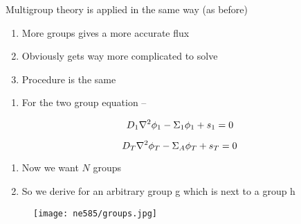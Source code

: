 \documentclass[aspectratio=1610,pdftex,dvipsnames,compress,xcolor={dvipsnames}]{beamer}
\begin{document}
\addtocounter{framenumber}{-1} 
\begin{frame}{Multigroup theory is applied in the same way (as before)}
    \begin{enumerate}[series=outerlist,topsep=0pt,itemsep=21pt,leftmargin=*,label=(\arabic*)]
        \item[]More groups gives a more accurate flux 
        \item[]Obviously gets way more complicated to solve  
        \item[]Procedure is the same
    \end{enumerate}

    \vspace*{\fill}

    \begin{enumerate}[series=outerlist,topsep=7pt,itemsep=0pt,leftmargin=*,label=(\arabic*)]
        \item[]For the two group equation --
    \end{enumerate}

    \begin{equation}
        \LARGE
        D_1 \nabla^2 \phi_1 -\Sigma_1 \phi_1 + s_1=0
    \end{equation}

    \begin{equation}
        \LARGE
        D_T \nabla^2 \phi_T -\Sigma_A \phi_T + s_T=0
    \end{equation}

    \vspace*{\fill}

    \begin{enumerate}[series=outerlist,topsep=0pt,itemsep=21pt,leftmargin=*,label=(\arabic*)]
        \item[]Now we want $N$ groups
        \item[]So we derive for an arbitrary group g which is next to a group h
    \end{enumerate}
\end{frame}


\begin{frame}{}
    \begin{figure}
        \centering
        \texttt{[image: ne585/groups.jpg]}
    \end{figure}
\end{frame}
\end{document}
